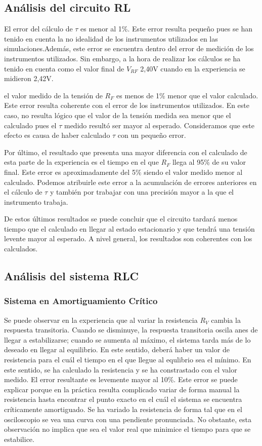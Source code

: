 \subsection{Análisis del circuito RL}
El error del cálculo de $\tau$ es menor al 1\%. Este error resulta pequeño pues se han tenido en cuenta la no idealidad de los instrumentos utilizados en las simulaciones.Además, este error se encuentra dentro del error de medición de los instrumentos utilizados. Sin embargo, a la hora de realizar los cálculos se ha tenido en cuenta como el valor final de $V_{RF}$  2,40V cuando en la experiencia se midieron 2,42V. 

el valor medido de la tensión de $R_F$ es menos de 1\% menor que el valor calculado. Este error resulta coherente con el error de los instrumentos utilizados. En este caso, no resulta lógico que el valor de la tensión medida sea menor que el calculado pues el $\tau$ medido resultó ser mayor al esperado. Consideramos que este efecto es causa de haber calculado $\tau$ con un pequeño error. 

Por último, el resultado que presenta una mayor diferencia con el calculado de esta parte de la experiencia es el tiempo en el que $R_F$ llega al 95\% de su valor final. Este error es aproximadamente del 5\% siendo el valor medido menor al calculado. Podemos atribuirle este error a la acumulación de errores anteriores en el cálculo de $\tau$ y también por trabajar con una precisión mayor a la que el instrumento trabaja.


De estos últimos resultados se puede concluir que el circuito tardará menos tiempo que el calculado en llegar al estado estacionario y que tendrá una tensión levente mayor al esperado. A nivel general, los resultados son coherentes con los calculados.

\subsection{Análisis del sistema RLC}
\subsubsection{Sistema en Amortiguamiento Crítico}
Se puede observar en la experiencia que al variar la resistencia $R_V$ cambia la respuesta transitoria. Cuando se disminuye, la respuesta transitoria oscila anes de llegar a estabilizarse; cuando se aumenta al máximo, el sistema tarda más de lo deseado en llegar al equilibrio. En este sentido, deberá haber un valor de resistencia para el cuál el tiempo en el que llegue al equlibrio sea el mínimo. 
En este sentido, se ha calculado la resistencia y se ha constrastado con el valor medido. El error resultante es levemente mayor al 10\%. Este error se puede explicar porque en la práctica resulta complicado variar de forma manual la resistencia hasta encontrar el punto exacto en el cuál el sistema se encuentra críticamente amortiguado. Se ha variado la resistencia de forma tal que en el osciloscopio se vea una curva con una pendiente pronunciada. No obstante, esta observación no implica que sea el valor real que minimice el tiempo para que se estabilice. 


